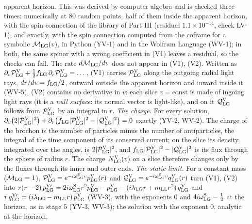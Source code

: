 \documentclass[
  10pt,
]{article}
\begin{document}
\begin{longtable}[]
apparent horizon. This was derived by computer algebra and is checked
three times: numerically at 80 random points, half of them inside the
apparent horizon, with the spin connection of the library of Part III
(residual \(1.1\times10^{-14}\), check LV-1), and exactly, with the spin
connection computed from the coframe for a symbolic
\(\mathcal M_{\rm LG}(v)\), in Python (YV-1) and in the Wolfram Language
(WV-1); in both, the same spinor with a wrong coefficient in (V1) leaves
a residual, so the checks can fail. The rate \(d\mathcal M_{\rm LG}/dv\)
does not appear in (V1), (V2). Written as
\(\partial_v\mathcal P^{\rm V}_{\rm LG}+\tfrac12 f_{\rm LG}\,\partial_r\mathcal P^{\rm V}_{\rm LG}=\dots\),
(V1) carries \(\mathcal P^{\rm V}_{\rm LG}\) along the outgoing radial
light rays, \(dr/dv=f_{\rm LG}/2\), outward outside the apparent horizon
and inward inside it (WV-5). (V2) contains no derivative in \(v\): each
slice \(v=\text{const}\) is made of ingoing light rays (it is a
\emph{null surface}: its normal vector is light-like), and on it
\(\mathcal Q^{\rm V}_{\rm LG}\) follows from
\(\mathcal P^{\rm V}_{\rm LG}\) by an integral in \(r\). \emph{The
charge.} For every solution,
\(\partial_v\big(2\lvert\mathcal P^{\rm V}_{\rm LG}\rvert^2\big)+\partial_r\big(f_{\rm LG}\lvert\mathcal P^{\rm V}_{\rm LG}\rvert^2-\lvert\mathcal Q^{\rm V}_{\rm LG}\rvert^2\big)=0\)
exactly (YV-2, WV-2). The charge of the brochon is the number of
particles minus the number of antiparticles, the integral of the time
component of its conserved current; on the slice its density, integrated
over the angles, is \(2\lvert\mathcal P^{\rm V}_{\rm LG}\rvert^2\), and
\(f_{\rm LG}\lvert\mathcal P^{\rm V}_{\rm LG}\rvert^2-\lvert\mathcal Q^{\rm V}_{\rm LG}\rvert^2\)
is its flux through the sphere of radius \(r\). The charge
\(N^{\rm V}_{\rm LG}(v)\) on a slice therefore changes only by the
fluxes through its inner and outer ends. \emph{The static limit.} For a
constant mass (\(\mathcal M_{\rm LG}=1\)),
\(\mathcal P^{\rm V}_{\rm LG}=e^{-i\omega^{\rm S}_{\rm LG}v}p^{\rm V}_{\rm LG}(r)\)
and
\(\mathcal Q^{\rm V}_{\rm LG}=e^{-i\omega^{\rm S}_{\rm LG}v}q^{\rm V}_{\rm LG}(r)\)
turn (V1), (V2) into
\(r(r-2)\,p^{\rm V\prime}_{\rm LG}=2i\omega^{\rm S}_{\rm LG}r^2p^{\rm V}_{\rm LG}-p^{\rm V}_{\rm LG}-(i\lambda_{\rm LG}r+m_{\rm LL}r^2)\,q^{\rm V}_{\rm LG}\)
and
\(r\,q^{\rm V\prime}_{\rm LG}=(i\lambda_{\rm LG}-m_{\rm LL}r)\,p^{\rm V}_{\rm LG}\)
(WV-3), with the exponents \(0\) and
\(4i\omega^{\rm S}_{\rm LG}-\tfrac12\) at the horizon, as in stage 5
(YV-3, WV-3); the solution with the exponent 0, analytic at the horizon,

\end{longtable}
\end{document}
